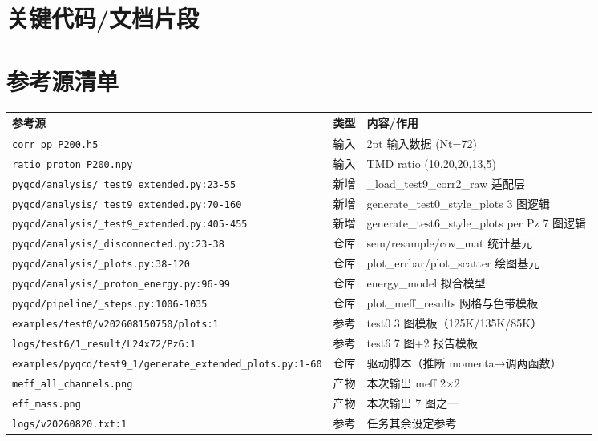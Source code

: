 \documentclass[UTF8]{ctexart}
\begin{document}
\section{关键代码/文档片段}





\section{参考源清单}
\begin{xltabular}{\textwidth}{XcX}
\toprule
\textcolor{evidence}{参考源} & 类型 & 内容/作用 \\
\midrule
\endhead
\texttt{\nolinkurl{corr\_pp\_P200.h5}} & 输入 & 2pt 输入数据 (Nt=72) \\
\texttt{\nolinkurl{ratio\_proton\_P200.npy}} & 输入 & TMD ratio (10,20,20,13,5) \\
\texttt{\nolinkurl{pyqcd/analysis/_test9_extended.py:23-55}} & 新增 & \_load\_test9\_corr2\_raw 适配层 \\
\texttt{\nolinkurl{pyqcd/analysis/_test9_extended.py:70-160}} & 新增 & generate\_test0\_style\_plots 3 图逻辑 \\
\texttt{\nolinkurl{pyqcd/analysis/_test9_extended.py:405-455}} & 新增 & generate\_test6\_style\_plots per Pz 7 图逻辑 \\
\texttt{\nolinkurl{pyqcd/analysis/_disconnected.py:23-38}} & 仓库 & sem/resample/cov\_mat 统计基元 \\
\texttt{\nolinkurl{pyqcd/analysis/_plots.py:38-120}} & 仓库 & plot\_errbar/plot\_scatter 绘图基元 \\
\texttt{\nolinkurl{pyqcd/analysis/_proton_energy.py:96-99}} & 仓库 & energy\_model 拟合模型 \\
\texttt{\nolinkurl{pyqcd/pipeline/_steps.py:1006-1035}} & 仓库 & plot\_meff\_results 网格与色带模板 \\
\texttt{\nolinkurl{examples/test0/v202608150750/plots:1}} & 参考 & test0 3 图模板（125K/135K/85K） \\
\texttt{\nolinkurl{logs/test6/1_result/L24x72/Pz6:1}} & 参考 & test6 7 图+2 报告模板 \\
\texttt{\nolinkurl{examples/pyqcd/test9_1/generate_extended_plots.py:1-60}} & 仓库 & 驱动脚本（推断 momenta→调两函数） \\
\texttt{\nolinkurl{meff\_all\_channels.png}} & 产物 & 本次输出 meff 2×2 \\
\texttt{\nolinkurl{eff\_mass.png}} & 产物 & 本次输出 7 图之一 \\
\texttt{\nolinkurl{logs/v20260820.txt:1}} & 参考 & 任务其余设定参考 \\
\bottomrule
\end{xltabular}
\end{document}
